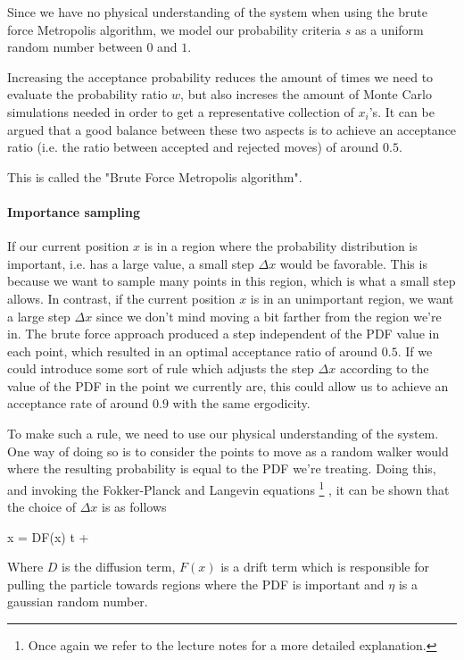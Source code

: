 Since we have no physical understanding of the system when using the brute force Metropolis algorithm, we model our probability criteria $s$ as a uniform random number between $0$ and $1$. 

Increasing the acceptance probability reduces the amount of times we need to evaluate the probability ratio $w$, but also increses the amount of Monte Carlo simulations needed in order to get a representative collection of $x_i$'s. 
It can be argued that a good balance between these two aspects is to achieve an acceptance ratio 
(i.e. the ratio between accepted and rejected moves) of around $0.5$. 

This is called the "Brute Force Metropolis algorithm". 

\paragraph{Importance sampling}

If our current position $x$ is in a region where the probability distribution is important, i.e. has a large value, a small step $\Delta x$ would be favorable. 
This is because we want to sample many points in this region, which is what a small step allows. 
In contrast, if the current position $x$ is in an unimportant region, we want a large step $\Delta x$ since we don't mind moving a bit farther from the region we're in. 
The brute force approach produced a step independent of the PDF value in each point, which resulted in an optimal acceptance ratio of around $0.5$. 
If we could introduce some sort of rule which adjusts the step $\Delta x$ according to the value of the PDF in the point we currently are, this could allow us to achieve an acceptance rate of around $0.9$ with the same ergodicity. 

To make such a rule, we need to use our physical understanding of the system. 
One way of doing so is to consider the points to move as a random walker would where the resulting probability is equal to the PDF we're treating.
Doing this, and invoking the Fokker-Planck and Langevin equations
\footnote{Once again we refer to the lecture notes \cite{lecturenotes} for a more detailed explanation.}
, it can be shown that the choice of $\Delta x$ is as follows

\eqs
\Delta x = DF(x) \delta t  + \eta 
\label{eq:importance_raw}
\eqf

Where $D$ is the diffusion term, $F(x)$ is a drift term which is responsible for pulling the particle towards regions where the PDF is important and $\eta$ is a gaussian random number.

